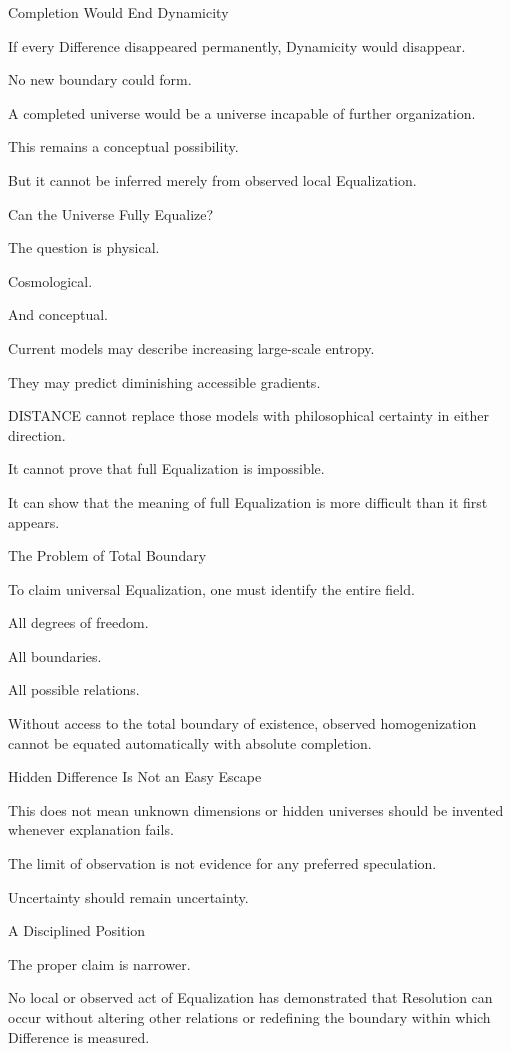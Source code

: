 Completion Would End Dynamicity

If every Difference disappeared permanently, Dynamicity would disappear.

No new boundary could form.

A completed universe would be a universe incapable of further organization.

This remains a conceptual possibility.

But it cannot be inferred merely from observed local Equalization.

Can the Universe Fully Equalize?

The question is physical.

Cosmological.

And conceptual.

Current models may describe increasing large-scale entropy.

They may predict diminishing accessible gradients.

DISTANCE cannot replace those models with philosophical certainty in either direction.

It cannot prove that full Equalization is impossible.

It can show that the meaning of full Equalization is more difficult than it first appears.

The Problem of Total Boundary

To claim universal Equalization, one must identify the entire field.

All degrees of freedom.

All boundaries.

All possible relations.

Without access to the total boundary of existence, observed homogenization cannot be equated automatically with absolute completion.

Hidden Difference Is Not an Easy Escape

This does not mean unknown dimensions or hidden universes should be invented whenever explanation fails.

The limit of observation is not evidence for any preferred speculation.

Uncertainty should remain uncertainty.

A Disciplined Position

The proper claim is narrower.

No local or observed act of Equalization has demonstrated that Resolution can occur without altering other relations or redefining the boundary within which Difference is measured.

